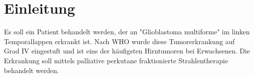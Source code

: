 \section{Einleitung}
\label{sec:Einleitung}
Es soll ein Patient behandelt werden, der an "Glioblastoma multiforme" im linken Temporallappen erkrankt ist. Nach WHO wurde diese Tumorerkrankung auf Grad IV eingestuft und ist eins der häufigsten Hirntumoren bei Erwachsenen. \cite{Glioblastom}
Die Erkrankung soll mittels palliative perkutane fraktionierte Strahlentherapie behandelt werden.

